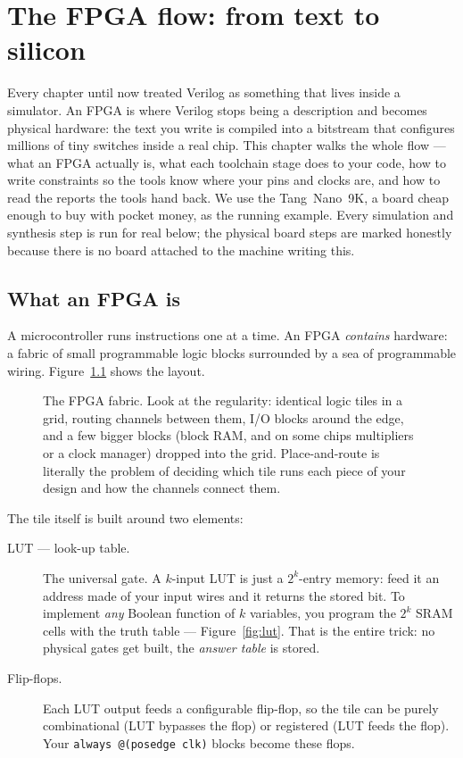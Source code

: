 \chapter{The FPGA flow: from text to silicon}
\label{ch:fpga-flow}

Every chapter until now treated Verilog as something that lives inside a
simulator. An FPGA is where Verilog stops being a description and becomes
physical hardware: the text you write is compiled into a bitstream that
configures millions of tiny switches inside a real chip. This chapter walks the
whole flow --- what an FPGA actually is, what each toolchain stage does to your
code, how to write constraints so the tools know where your pins and clocks
are, and how to read the reports the tools hand back. We use the
Tang~Nano~9K, a board cheap enough to buy with pocket money, as the running
example. Every simulation and synthesis step is run for real below; the
physical board steps are marked honestly because there is no board attached to
the machine writing this.

\section{What an FPGA is}

A microcontroller runs instructions one at a time. An FPGA \emph{contains}
hardware: a fabric of small programmable logic blocks surrounded by a sea of
programmable wiring. Figure~\ref{fig:fabric} shows the layout.

\begin{figure}[htbp]\centering

\caption{The FPGA fabric. Look at the regularity: identical logic tiles in a
grid, routing channels between them, I/O blocks around the edge, and a few
bigger blocks (block RAM, and on some chips multipliers or a clock manager)
dropped into the grid. Place-and-route is literally the problem of deciding
which tile runs each piece of your design and how the channels connect them.}
\label{fig:fabric}
\end{figure}

The tile itself is built around two elements:

\begin{description}
\item[LUT --- look-up table.] The universal gate. A $k$-input LUT is just a
$2^k$-entry memory: feed it an address made of your input wires and it returns
the stored bit. To implement \emph{any} Boolean function of $k$ variables, you
program the $2^k$ SRAM cells with the truth table --- Figure~\ref{fig:lut}.
That is the entire trick: no physical gates get built, the \emph{answer table}
is stored.
\item[Flip-flops.] Each LUT output feeds a configurable flip-flop, so the tile
can be purely combinational (LUT bypasses the flop) or registered (LUT feeds
the flop). Your \texttt{always @(posedge clk)} blocks become these flops.
\end{description}

